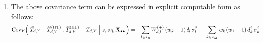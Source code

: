\begin{lemma}
\begin{enumerate}
\begin{eqnarray*}
            \;\right\vert\,
            s,s_{R},\Xobs
            \,\right)
    \\
    &&
        +\;
        E_{Y}\!\left[\;
            \left.
            \widetilde{T}_{d,Y} - \widehat{T}^{\textnormal{(HT)}}_{d,Y}
            \;\right\vert\,
            s,s_{R},\Xobs
            \,\right]
        \cdot
        {\color{red}E_{Y}\!\left[\;
            \left.
            \widehat{T}^{\textnormal{(HT)}}_{d,Y} - T_{d,Y}
            \;\right\vert\,
            s,s_{R},\Xobs
            \,\right]}
    \end{eqnarray*}
\item
    The above covariance term can be expressed in explicit computable form as follows:
    \begin{eqnarray*}
    \textnormal{Cov}_{Y}\!\left(\,
        \left.
        \widetilde{T}_{d,Y} - \widehat{T}^{\textnormal{(HT)}}_{d,Y}
        \,,\,
        \widehat{T}^{\textnormal{(HT)}}_{d,Y} - T_{d,Y}
        \;\right\vert\,
        s,s_{R},\mathbf{X}_{\bullet\bullet}
        \,\right)
    & = &
        \underset{l \in s_{R}}{\sum}\,
            W^{(+)}_{d,l}\,(w_{k}-1)\,d_{l}\,\sigma_{l}^{2}
        \,-\,
        \underset{k \in s_{M}}{\sum}\,
            w_{k}\,(w_{1}-1)\,d_{k}^{2}\,\sigma_{k}^{2}
    \end{eqnarray*}
\end{enumerate}
\end{lemma}
\proof
